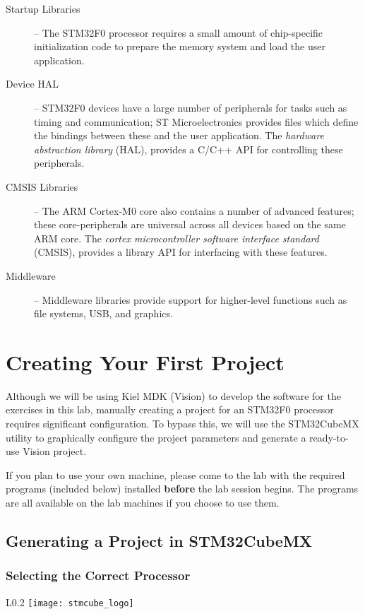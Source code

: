 \documentclass[openany,11pt,fleqn]{book} %
\begin{document}
\begin{description}
	\item[Startup Libraries] -- The STM32F0 processor requires a small amount of chip-specific initialization code to prepare the memory system and load the user application.  
	\item[Device HAL] -- STM32F0 devices have a large number of peripherals for tasks such as timing and communication; ST Microelectronics provides files which define the bindings between these and the user application. The \textit{hardware abstraction library} (HAL), provides a C/C++ API for controlling these peripherals.
	\item[CMSIS Libraries] -- The ARM Cortex-M0 core also contains a number of advanced features; these core-peripherals are universal across all devices based on the same ARM core. The \textit{cortex microcontroller software interface standard} (CMSIS), provides a library API for interfacing with these features. 
	\item[Middleware] -- Middleware libraries provide support for higher-level functions such as file systems, USB, and graphics.
\end{description}


\section{Creating Your First Project}
Although we will be using Kiel MDK ({\textmu}Vision) to develop the software for the exercises in this lab, manually creating a project for an STM32F0 processor requires significant configuration. To bypass this, we will use the STM32CubeMX utility to graphically configure the project parameters and generate a ready-to-use {\textmu}Vision project. 

\begin{warning}
	If you plan to use your own machine, please come to the lab with the required programs (included below) installed \textbf{before} the lab session begins. The programs are all available on the lab machines if you choose to use them.
\end{warning}

\subsection{Generating a Project in STM32CubeMX}
\subsubsection*{Selecting the Correct Processor}
\begin{wrapfigure}{L}{0.2\textwidth}
	\centering\texttt{[image: stmcube\_logo]}
\end{wrapfigure}
\end{document}
